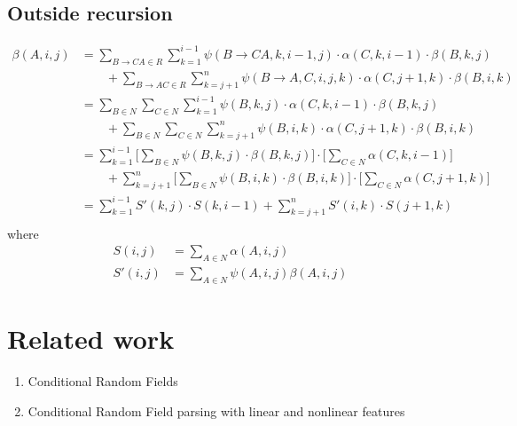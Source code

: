 \subsection{Outside recursion}
\begin{align*}
    \beta(A, i, j) &= \sum_{B \to C A \in R} \sum_{k=1}^{i-1} \psi(B \to C A, k, i-1, j) \cdot \alpha(C, k, i-1) \cdot \beta(B, k, j) \\
            &\qquad + \sum_{B \to A C \in R} \sum_{k=j+1}^{n} \psi(B \to A, C, i, j, k) \cdot \alpha(C, j+1, k) \cdot \beta(B, i, k) \\
        &= \sum_{B \in N} \sum_{C \in N} \sum_{k=1}^{i-1} \psi(B, k, j) \cdot \alpha(C, k, i-1) \cdot \beta(B, k, j) \\
            &\qquad + \sum_{B \in N} \sum_{C \in N} \sum_{k=j+1}^{n} \psi(B, i, k) \cdot \alpha(C, j+1, k) \cdot \beta(B, i, k) \\
        &=  \sum_{k=1}^{i-1}  \Bigg[ \sum_{B \in N} \psi(B, k, j)  \cdot \beta(B, k, j) \Bigg] \cdot \Bigg[ \sum_{C \in N} \alpha(C, k, i-1) \Bigg] \\
            &\qquad + \sum_{k=j+1}^{n}  \Bigg[ \sum_{B \in N}  \psi(B, i, k) \cdot \beta(B, i, k) \Bigg] \cdot  \Bigg[ \sum_{C \in N} \alpha(C, j+1, k) \Bigg] \\
        &=  \sum_{k=1}^{i-1}  S'(k, j) \cdot S(k, i-1) + \sum_{k=j+1}^{n} S'(i, k) \cdot  S(j+1, k) \\
\end{align*}
where
\begin{align*}
    S(i, j) &= \sum_{A \in N} \alpha(A, i, j) \\
    S'(i, j) &= \sum_{A \in N} \psi(A, i, j) \beta(A, i, j)
\end{align*}


\section{Related work}
\begin{enumerate}
  \item Conditional Random Fields \citep{Sutton+2012:CRF}
  \item Conditional Random Field parsing with linear \citep{Finkel+2008} and nonlinear features \citep{Klein+2015:neural-crf}
\end{enumerate}



